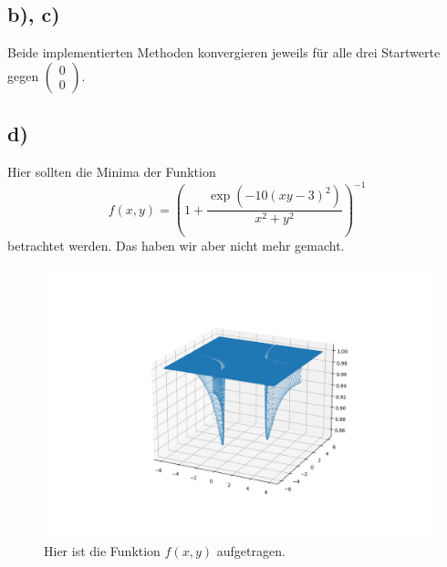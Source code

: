 \subsection{b), c)}
    Beide implementierten Methoden konvergieren jeweils für alle drei Startwerte gegen $\begin{pmatrix}
        0 \\ 0
    \end{pmatrix}$.


\subsection{d)}
    Hier sollten die Minima der Funktion
    \begin{equation}
         f(x,y) = \left(1 + \frac{\exp(-10(xy-3)^2)}{x^2 + y^2}\right)^{-1}
    \end{equation}
    betrachtet werden.
    Das haben wir aber nicht mehr gemacht.

    \begin{figure}[H]
        \centering
        \includegraphics[width=1\textwidth]{pictures/function.png} \vspace*{-0.5cm}
        \caption{Hier ist die Funktion $f(x,y)$ aufgetragen.}
        \label{fig:function}
    \end{figure}
    \FloatBarrier
